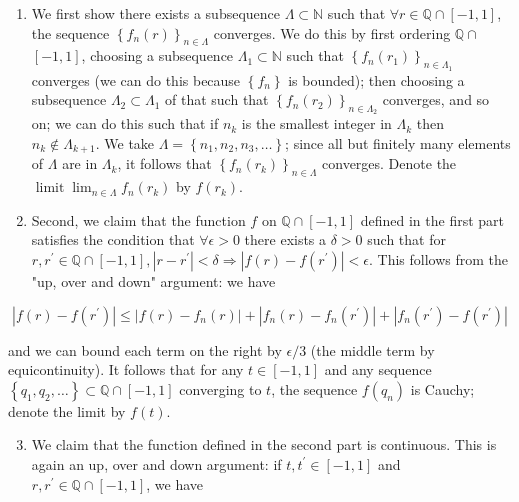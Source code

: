 \documentclass[10pt]{article}
\begin{document}
\begin{enumerate}
  \item We first show there exists a subsequence $\Lambda \subset \mathbb{N}$ such that $\forall r \in \mathbb{Q} \cap[-1,1]$, the sequence $\left\{f_{n}(r)\right\}_{n \in \Lambda}$ converges. We do this by first ordering $\mathbb{Q} \cap$ $[-1,1]$, choosing a subsequence $\Lambda_{1} \subset \mathbb{N}$ such that $\left\{f_{n}\left(r_{1}\right)\right\}_{n \in \Lambda_{1}}$ converges
(we can do this because $\left\{f_{n}\right\}$ is bounded); then choosing a subsequence $\Lambda_{2} \subset \Lambda_{1}$ of that such that $\left\{f_{n}\left(r_{2}\right)\right\}_{n \in \Lambda_{2}}$ converges, and so on; we can do this such that if $n_{k}$ is the smallest integer in $\Lambda_{k}$ then $n_{k} \notin \Lambda_{k+1}$. We take $\Lambda=\left\{n_{1}, n_{2}, n_{3}, \ldots\right\}$; since all but finitely many elements of $\Lambda$ are in $\Lambda_{k}$, it follows that $\left\{f_{n}\left(r_{k}\right)\right\}_{n \in \Lambda}$ converges. Denote the $\operatorname{limit} \lim _{n \in \Lambda} f_{n}\left(r_{k}\right)$ by $f\left(r_{k}\right)$.

  \item Second, we claim that the function $f$ on $\mathbb{Q} \cap[-1,1]$ defined in the first part satisfies the condition that $\forall \epsilon>0$ there exists a $\delta>0$ such that for $r, r^{\prime} \in \mathbb{Q} \cap[-1,1],\left|r-r^{\prime}\right|<\delta \Longrightarrow\left|f(r)-f\left(r^{\prime}\right)\right|<\epsilon$. This follows from the "up, over and down" argument: we have

\end{enumerate}

$$
\left|f(r)-f\left(r^{\prime}\right)\right| \leq\left|f(r)-f_{n}(r)\right|+\left|f_{n}(r)-f_{n}\left(r^{\prime}\right)\right|+\left|f_{n}\left(r^{\prime}\right)-f\left(r^{\prime}\right)\right|
$$

and we can bound each term on the right by $\epsilon / 3$ (the middle term by equicontinuity). It follows that for any $t \in[-1,1]$ and any sequence $\left\{q_{1}, q_{2}, \ldots\right\} \subset \mathbb{Q} \cap[-1,1]$ converging to $t$, the sequence $f\left(q_{n}\right)$ is Cauchy; denote the limit by $f(t)$.

\begin{enumerate}
  \setcounter{enumi}{2}
  \item We claim that the function defined in the second part is continuous. This is again an up, over and down argument: if $t, t^{\prime} \in[-1,1]$ and $r, r^{\prime} \in \mathbb{Q} \cap[-1,1]$, we have
\end{enumerate}
\end{document}
